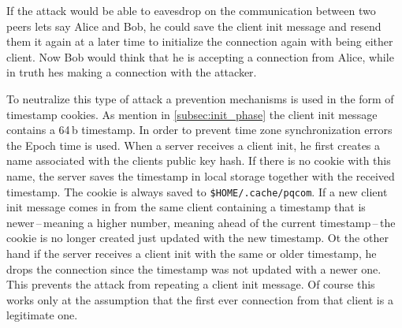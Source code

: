 If the attack would be able to eavesdrop on the communication between two peers lets say Alice and Bob, he could save the client init message and resend them it again at a later time to initialize the connection again with being either client. Now Bob would think that he is accepting a connection from Alice, while in truth hes making a connection with the attacker.

To neutralize this type of attack a prevention mechanisms is used in the form of timestamp cookies. As mention in \ref{subsec:init_phase} the client init message contains a 64\,b timestamp. In order to prevent time zone synchronization errors the Epoch time is used. When a server receives a client init, he first creates a name associated with the clients public key hash. If there is no cookie with this name, the server saves the timestamp in local storage together with the received timestamp. The cookie is always saved to \texttt{\$HOME/.cache/pqcom}. If a new client init message comes in from the same client containing a timestamp that is newer\,--\,meaning a higher number, meaning ahead of the current timestamp\,--\,the cookie is no longer created just updated with the new timestamp. Ot the other hand if the server receives a client init with the same or older timestamp, he drops the connection since the timestamp was not updated with a newer one. This prevents the attack from repeating a client init message. Of course this works only at the assumption that the first ever connection from that client is a legitimate one.
